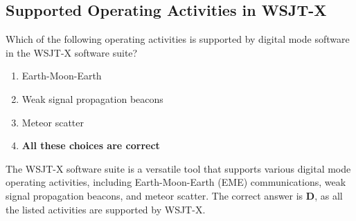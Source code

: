 \subsection{Supported Operating Activities in WSJT-X}
\label{T8D10}

\begin{tcolorbox}[colback=gray!10!white,colframe=black!75!black,title=T8D10]
Which of the following operating activities is supported by digital mode software in the WSJT-X software suite?
\begin{enumerate}[noitemsep]
    \item Earth-Moon-Earth
    \item Weak signal propagation beacons
    \item Meteor scatter
    \item \textbf{All these choices are correct}
\end{enumerate}
\end{tcolorbox}

The WSJT-X software suite is a versatile tool that supports various digital mode operating activities, including Earth-Moon-Earth (EME) communications, weak signal propagation beacons, and meteor scatter. The correct answer is \textbf{D}, as all the listed activities are supported by WSJT-X.